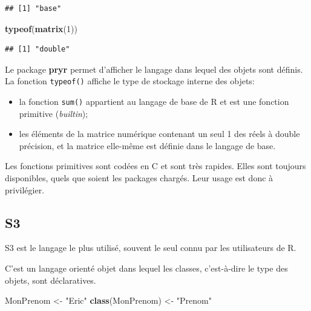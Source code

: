 \documentclass[
  12pt,
  french,
  a4paper,
  extrafontsizes,onecolumn,openright
  ]{memoir}
\newenvironment{Shaded}{\begin{snugshade}}{\end{snugshade}}
\newcommand{\DecValTok}[1]{\textcolor[rgb]{0.00,0.00,0.81}{#1}}
\newcommand{\KeywordTok}[1]{\textcolor[rgb]{0.13,0.29,0.53}{\textbf{#1}}}
\newcommand{\NormalTok}[1]{#1}
\newcommand{\StringTok}[1]{\textcolor[rgb]{0.31,0.60,0.02}{#1}}
\providecommand{\tightlist}{%
  \setlength{\itemsep}{0pt}\setlength{\parskip}{0pt}}
\begin{document}
\begin{verbatim}
## [1] "base"
\end{verbatim}

\begin{Shaded}
\begin{Highlighting}[]
\KeywordTok{typeof}\NormalTok{(}\KeywordTok{matrix}\NormalTok{(}\DecValTok{1}\NormalTok{))}
\end{Highlighting}
\end{Shaded}

\begin{verbatim}
## [1] "double"
\end{verbatim}

\normalsize

Le package \textbf{pryr} permet d'afficher le langage dans lequel des objets sont définis.
La fonction \texttt{typeof()} affiche le type de stockage interne des objets:

\begin{itemize}
\tightlist
\item
  la fonction \texttt{sum()} appartient au langage de base de R et est une fonction primitive (\emph{builtin});
\item
  les éléments de la matrice numérique contenant un seul 1 des réels à double précision, et la matrice elle-même est définie dans le langage de base.
\end{itemize}

Les fonctions primitives sont codées en C et sont très rapides.
Elles sont toujours disponibles, quels que soient les packages chargés.
Leur usage est donc à privilégier.

\hypertarget{sec:S3}{%
\subsection{S3}\label{sec:S3}}

S3 est le langage le plus utilisé, souvent le seul connu par les utilisateurs de R.

C'est un langage orienté objet dans lequel les classes, c'est-à-dire le type des objets, sont déclaratives.

\scriptsize

\begin{Shaded}
\begin{Highlighting}[]
\NormalTok{MonPrenom <-}\StringTok{ "Eric"}
\KeywordTok{class}\NormalTok{(MonPrenom) <-}\StringTok{ "Prenom"}
\end{Highlighting}
\end{Shaded}
\end{document}

